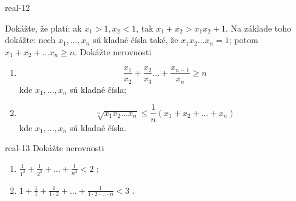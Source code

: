 \begin{defproblem}{real-12}
\begin{tasks}
  \task Dokážte, že platí: ak $x_1 > 1, x_2 < 1$, tak $x_1 + x_2 > x_1 x_2 + 1$.
  \task Na základe toho dokážte: nech $x_1, \ldots, x_n$ sú kladné čísla také,
        že $x_1 x_2 \ldots x_n = 1$; potom $x_1 + x_2 + \ldots x_n \geq n$.
  \task Dokážte nerovnosti
    \begin{enumerate}[label=(\roman*)]
      \item
        \[
          \frac{x_1}{x_2} + \frac{x_2}{x_3} \ldots + \frac{x_{n-1}}{x_n} \geq n
        \]
        kde $x_1, \ldots, x_n$ sú kladné čísla;
      \item
        \[
          \sqrt[n]{x_1 x_2 \ldots x_n} \leq \frac{1}{n}(x_1 + x_2 + \ldots + x_n)
        \]
        kde $x_1, \ldots, x_n$ sú kladné čísla.
    \end{enumerate}
\end{tasks}
\end{defproblem}

\begin{defproblem}{real-13}
Dokážte nerovnosti

\begin{enumerate}
  \item $\frac{1}{1^2} + \frac{1}{2^2} + \ldots + \frac{1}{n^2} < 2$ ;
  \item $1 + \frac{1}{1} + \frac{1}{1 \cdot 2} + \ldots +
         \frac{1}{1 \cdot 2 \cdot \ldots \cdot n} < 3$ .
\end{enumerate}
\end{defproblem}
